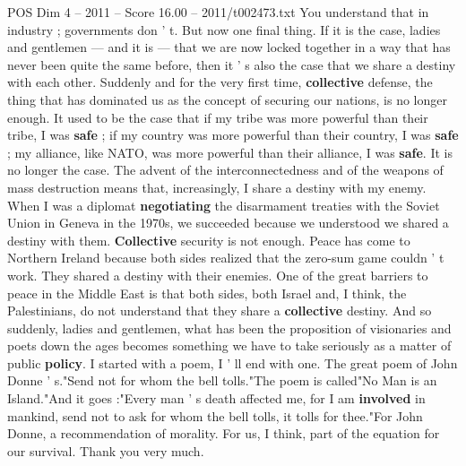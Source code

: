 \begin{textsample}{POS Dim 4 – 2011 – Score 16.00 – 2011/t002473.txt}
You understand that in industry ; governments don ' t.
But now one final thing.
If it is the case, ladies and gentlemen — and it is — that we are now locked together in a way that has never been quite the same before, then it ' s also the case that we share a destiny with each other.
Suddenly and for the very first time, \textbf{collective} defense, the thing that has dominated us as the concept of securing our nations, is no longer enough.
It used to be the case that if my tribe was more powerful than their tribe, I was \textbf{safe} ; if my country was more powerful than their country, I was \textbf{safe} ; my alliance, like NATO, was more powerful than their alliance, I was \textbf{safe}.
It is no longer the case.
The advent of the interconnectedness and of the weapons of mass destruction means that, increasingly, I share a destiny with my enemy.
When I was a diplomat \textbf{negotiating} the disarmament treaties with the Soviet Union in Geneva in the 1970s, we succeeded because we understood we shared a destiny with them. \textbf{Collective} security is not enough.
Peace has come to Northern Ireland because both sides realized that the zero-sum game couldn ' t work.
They shared a destiny with their enemies.
One of the great barriers to peace in the Middle East is that both sides, both Israel and, I think, the Palestinians, do not understand that they share a \textbf{collective} destiny.
And so suddenly, ladies and gentlemen, what has been the proposition of visionaries and poets down the ages becomes something we have to take seriously as a matter of public \textbf{policy}.
I started with a poem, I ' ll end with one.
The great poem of John Donne ' s."Send not for whom the bell tolls."The poem is called"No Man is an Island."And it goes :"Every man ' s death affected me, for I am \textbf{involved} in mankind, send not to ask for whom the bell tolls, it tolls for thee."For John Donne, a recommendation of morality.
For us, I think, part of the equation for our survival.
Thank you very much.

\end{textsample}
